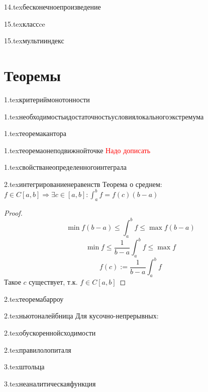 {14.tex}{бесконечноепроизведение}

{15.tex}{классce}

{15.tex}{мультииндекс}

\section{Теоремы}

{1.tex}{критериймонотонности}

{1.tex}{необходимостьидостаточностьусловиялокальногоэкстремума}

{1.tex}{теоремакантора}

{1.tex}{теоремаонеподвижнойточке}
\textcolor{red}{Надо дописать}

{1.tex}{свойстванеопределенногоинтеграла}
\label{integralproperties}

{2.tex}{интегрированиенеравенств}
Теорема о среднем: $f\in C[a,b] \Rightarrow \exists c\in[a,b] : \int_a^b f = f(c)(b-a)$
\begin{proof}
    $$\min f(b-a)\le \int_a^b f \le \max f(b-a)$$
    $$\min f\le \frac{1}{b-a}\int_a^b f \le \max f$$
    $$f(c) := \frac{1}{b-a}\int_a^b f$$
    Такое $c$ существует, т.к. $f\in C[a,b]$
\end{proof}

{2.tex}{теоремабарроу}

{2.tex}{ньютоналейбница}
Для кусочно-непрерывных:\\

{2.tex}{обускореннойсходимости}

{2.tex}{правилолопиталя}

{3.tex}{штольца}

{3.tex}{неаналитическаяфункция}

